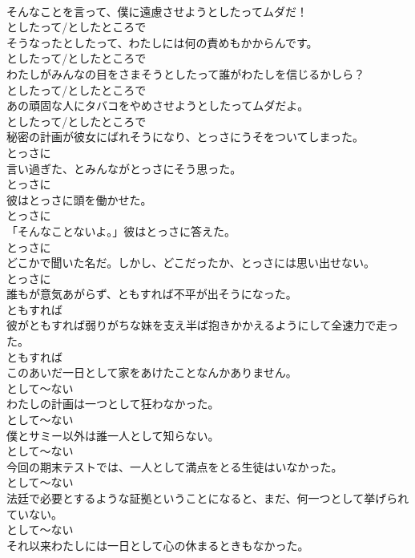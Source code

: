 \documentclass[8pt]{extreport}
\begin{document}
\begin{CJK}{UTF8}{min}
\\	そんなことを言って、僕に遠慮させようとしたってムダだ！	
\\	としたって/としたところで
\\	そうなったとしたって、わたしには何の責めもかからんです。	
\\	としたって/としたところで
\\	わたしがみんなの目をさまそうとしたって誰がわたしを信じるかしら？	
\\	としたって/としたところで
\\	あの頑固な人にタバコをやめさせようとしたってムダだよ。	
\\	としたって/としたところで
\\	秘密の計画が彼女にばれそうになり、とっさにうそをついてしまった。	
\\	とっさに
\\	言い過ぎた、とみんながとっさにそう思った。	
\\	とっさに
\\	彼はとっさに頭を働かせた。	
\\	とっさに
\\	「そんなことないよ。」彼はとっさに答えた。	
\\	とっさに
\\	どこかで聞いた名だ。しかし、どこだったか、とっさには思い出せない。	
\\	とっさに
\\	誰もが意気あがらず、ともすれば不平が出そうになった。	
\\	ともすれば
\\	彼がともすれば弱りがちな妹を支え半ば抱きかかえるようにして全速力で走った。	
\\	ともすれば
\\	このあいだ一日として家をあけたことなんかありません。	
\\	として～ない
\\	わたしの計画は一つとして狂わなかった。	
\\	として～ない
\\	僕とサミー以外は誰一人として知らない。	
\\	として～ない
\\	今回の期末テストでは、一人として満点をとる生徒はいなかった。	
\\	として～ない
\\	法廷で必要とするような証拠ということになると、まだ、何一つとして挙げられていない。	
\\	として～ない
\\	それ以来わたしには一日として心の休まるときもなかった。	

\end{CJK}
\end{document}
